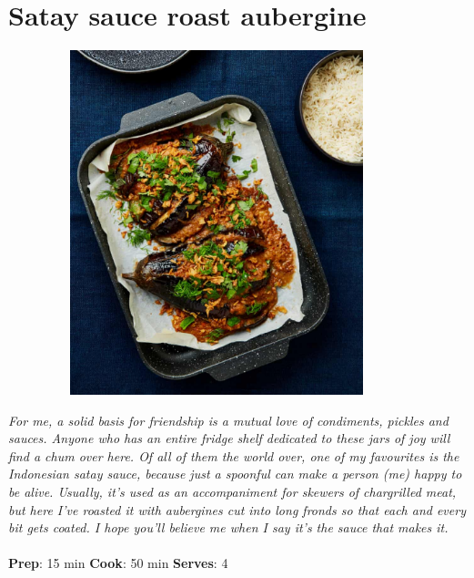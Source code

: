 \documentclass{book}
\begin{document}
\section{Satay sauce roast aubergine}
\begin{figure}
\centering\includegraphics[width=10cm,height=10cm,keepaspectratio]{Recipe_Pictures/Satay_sauce_roast_aubergine.png}
\end{figure}
\emph{For me, a solid basis for friendship is a mutual love of condiments, pickles and sauces. Anyone who has an entire fridge shelf dedicated to these jars of joy will find a chum over here. Of all of them the world over, one of my favourites is the Indonesian satay sauce, because just a spoonful can make a person (me) happy to be alive. Usually, it’s used as an accompaniment for skewers of chargrilled meat, but here I’ve roasted it with aubergines cut into long fronds so that each and every bit gets coated. I hope you’ll believe me when I say it’s the sauce that makes it.}\\\\ 
\textbf{Prep}: 15 min
\textbf{Cook}: 50 min
\textbf{Serves}: 4
\end{document}
